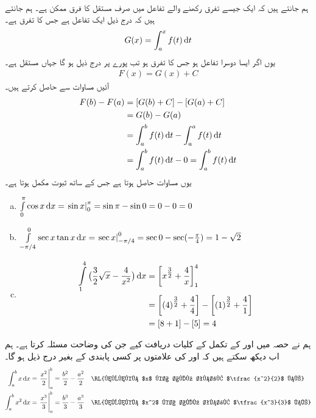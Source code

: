 \\
ہم جانتے ہیں کہ ایک جیسے تفرق رکھنے والے تفاعل میں صرف مستقل کا فرق ممکن ہے۔ ہم جانتے ہیں کہ درج ذیل ایک تفاعل ہے جس کا تفرق  ہے۔
\begin{align*}
G(x)=\int_a^xf(t)\dif t
\end{align*}
یوں اگر  ایسا دوسرا تفاعل ہو جس کا تفرق  ہو تب پورے  پر درج ذیل ہو گا جہاں  مستقل ہے۔
\begin{align}\label{مساوات_تکمل_بنیادی_مسئلہ_جزو_دوم_ب}
F(x)=G(x)+C
\end{align}
آئیں مساوات  سے  حاصل کرتے ہیں۔
\begin{align*}
F(b)-F(a)&=[G(b)+C]-[G(a)+C]\\
&=G(b)-G(a)\\
&=\int_a^bf(t)\dif t-\int_a^af(t)\dif t\\
&=\int_a^bf(t)\dif t-0=\int_a^bf(t)\dif t
\end{align*}
یوں مساوات  حاصل ہوتا ہے جس کے ساتھ ثبوت مکمل ہوتا ہے۔
\begin{enumerate}[a.]
\item
$\int\limits_0^{\pi}\cos x\dif x=\left.\sin x\right|_0^{\pi}=\sin \pi-\sin 0=0-0=0$
\item
$\int\limits_{-\pi/4}^0\sec x\tan x\dif x=\left.\sec x\right|_{-\pi/4}^0=\sec 0-\sec(-\tfrac{\pi}{4})=1-\sqrt{2}$
\item
\begin{align*}\int\limits_1^4\big(\frac{3}{2}\sqrt{x}-\frac{4}{x^2}\big)\dif x&=\left[x^{\tfrac{3}{2}}+\frac{4}{x}\right]_1^4\\
&=\left[(4)^{\tfrac{3}{2}}+\frac{4}{4}\right]-\left[(1)^{\tfrac{3}{2}}+\frac{4}{1}\right]\\
&=[8+1]-[5]=4
\end{align*}
\end{enumerate}
ہم نے حصہ  میں  اور  کے تکمل کے کلیات دریافت کیے جن کی وضاحت مسئلہ  کرتا ہے۔ ہم اب دیکھ سکتے ہیں کہ  اور  کی علامتوں پر کسی پابندی کے بغیر درج ذیل ہو گا۔
\begin{align*}
\int_a^bx\dif x&=\left.\frac{x^2}{2}\right|_a^b=\frac{b^2}{2}-\frac{a^2}{2}&&\text{\RL{چونکہ $x$ کا الٹ تفرق $\tfrac{x^2}{2}$ ہے}}\\
\int_a^bx^2\dif x&=\left.\frac{x^3}{3}\right|_a^b=\frac{b^3}{3}-\frac{a^3}{3}&&\text{\RL{چونکہ $x^2$ کا الٹ تفرق $\tfrac{x^3}{3}$ ہے}}
\end{align*}


